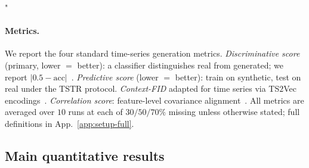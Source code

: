 "\documentclass{article}
\theoremstyle{plain}
\theoremstyle{definition}
\theoremstyle{remark}
\begin{document}
\paragraph{Metrics.}
We report the four standard time-series generation metrics. \emph{Discriminative score} (primary, lower $=$ better): a classifier distinguishes real from generated; we report $|0.5 - \mathrm{acc}|$~\citep{yoon2019timegan}. \emph{Predictive score} (lower $=$ better): train on synthetic, test on real under the TSTR protocol. \emph{Context-FID} adapted for time series via TS$2$Vec encodings~\citep{jeha2022psafid,yue2022ts2vec}. \emph{Correlation score}: feature-level covariance alignment~\citep{liao2020conditional}. All metrics are averaged over $10$ runs at each of $30/50/70\%$ missing unless otherwise stated; full definitions in App.~\ref{app:setup-full}.

\vspace{-1mm}
\subsection{Main quantitative results}
\label{sec:quant-results}
\vspace{-1mm}
\end{document}
